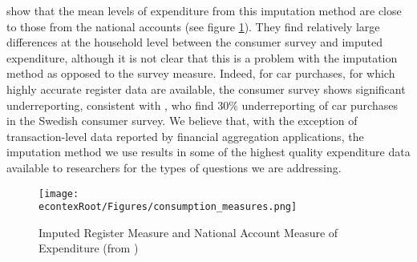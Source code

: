 \documentclass[titlepage]{\econtex}\newcommand{\texname}{ConsumptionHeterogeneity}
\begin{document}
\cite{abildgren_consistency_2018} show that the mean levels of expenditure from this imputation method are close to those from the national accounts (see figure \ref{fig:ConsumptionMeasures}). They find relatively large differences at the household level between the consumer survey and imputed expenditure, although it is not clear that this is a problem with the imputation method as opposed to the survey measure. Indeed, for car purchases, for which highly accurate register data are available, the consumer survey shows significant underreporting, consistent with \cite{koijen_judging_2014}, who find 30\% underreporting of car purchases in the Swedish consumer survey. We believe that, with the exception of transaction-level data reported by financial aggregation applications, the imputation method we use results in some of the highest quality expenditure data available to researchers for the types of questions we are addressing.
\begin{figure} 
	\begin{centering}
		\texttt{[image: \\econtexRoot/Figures/consumption\_measures.png]} 
		\caption{Imputed Register Measure and National Account Measure of Expenditure (from \cite{abildgren_consistency_2018})}
		\label{fig:ConsumptionMeasures}
	\end{centering}
\end{figure}
\end{document}
